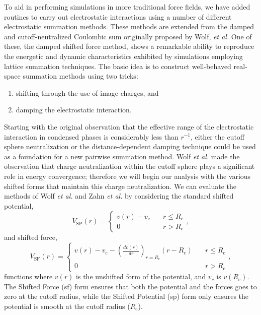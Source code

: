 \documentclass[]{book}
\begin{document}
To aid in performing simulations in more traditional force fields, we
have added routines to carry out electrostatic interactions using a
number of different electrostatic summation methods.  These methods
are extended from the damped and cutoff-neutralized Coulombic sum
originally proposed by Wolf, {\it et al.}\cite{Wolf99} One of these,
the damped shifted force method, shows a remarkable ability to
reproduce the energetic and dynamic characteristics exhibited by
simulations employing lattice summation techniques.  The basic idea is
to construct well-behaved real-space summation methods using two tricks:
\begin{enumerate}
\item shifting through the use of image charges, and 
\item damping the electrostatic interaction.
\end{enumerate} 
Starting with the original observation that the effective range of the
electrostatic interaction in condensed phases is considerably less
than $r^{-1}$, either the cutoff sphere neutralization or the
distance-dependent damping technique could be used as a foundation for
a new pairwise summation method.  Wolf \textit{et al.} made the
observation that charge neutralization within the cutoff sphere plays
a significant role in energy convergence; therefore we will begin our
analysis with the various shifted forms that maintain this charge
neutralization.  We can evaluate the methods of Wolf
\textit{et al.}  and Zahn \textit{et al.} by considering the standard
shifted potential,
\begin{equation}
V_\textrm{SP}(r) =      \begin{cases}
v(r)-v_\textrm{c} &\quad r\leqslant R_\textrm{c} \\ 0 &\quad r >
R_\textrm{c}  
\end{cases},
\label{eq:shiftingPotForm}
\end{equation}
and shifted force,
\begin{equation}
V_\textrm{SF}(r) =      \begin{cases}
v(r)-v_\textrm{c}-\left(\frac{d v(r)}{d r}\right)_{r=R_\textrm{c}}(r-R_\textrm{c
})
&\quad r\leqslant R_\textrm{c} \\ 0 &\quad r > R_\textrm{c} 
                                                \end{cases},
\label{eq:shiftingForm}
\end{equation}
functions where $v(r)$ is the unshifted form of the potential, and
$v_c$ is $v(R_\textrm{c})$.  The Shifted Force ({\sc sf}) form ensures
that both the potential and the forces goes to zero at the cutoff
radius, while the Shifted Potential ({\sc sp}) form only ensures the
potential is smooth at the cutoff radius
($R_\textrm{c}$).\cite{Allen87}
\end{document}
